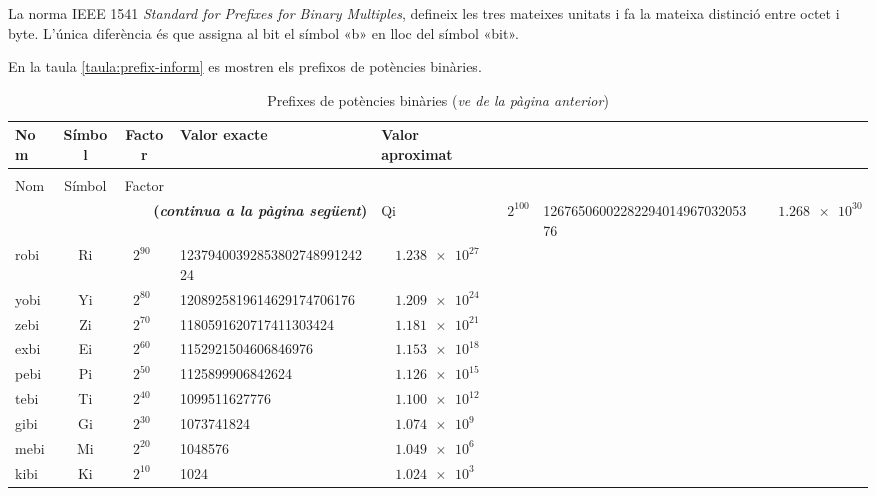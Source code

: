 La norma IEEE 1541 \textit{Standard for Prefixes for Binary Multiples}, defineix les tres mateixes unitats i fa la mateixa distinció entre octet i byte. L'única diferència és que assigna al bit el símbol «b» en lloc del símbol «bit».

En la taula \vref{taula:prefix-inform} es mostren els prefixos de potències binàries.
\begin{longtable}[h]{lccll}
   \caption{\label{taula:prefix-inform} Prefixos de potències binàries}\\
   \toprule[1pt]
    Nom & Símbol  & Factor & Valor exacte & Valor aproximat\\
   \midrule
   \endfirsthead
   \caption[]{Prefixes de potències binàries (\emph{ve de la pàgina anterior})}\\
   \toprule[1pt]
    Nom & Símbol  & Factor \\
   \midrule
   \endhead
   \midrule
   \multicolumn{4}{r}{\sffamily\bfseries\color{NavyBlue}(\emph{continua a la pàgina següent})}
   \endfoot
   \endlastfoot
   quebi & Qi   & $2^{100}$ & \num{1267650600228229401496703205376} &  $\quad\num{1,268e30}$ \\
   robi & Ri   & $2^{90\phantom{0}}$ & \num{1237940039285380274899124224} &  $\quad\num{1,238e27}$ \\
   yobi & Yi   & $2^{80\phantom{0}}$ & \num{1208925819614629174706176} &  $\quad\num{1,209e24}$ \\
   zebi & Zi   & $2^{70\phantom{0}}$ & \num{1180591620717411303424}&  $\quad\num{1,181e21}$ \\
   exbi & Ei   & $2^{60\phantom{0}}$ & \num{1152921504606846976}&  $\quad\num{1,153e18}$ \\
   pebi & Pi   & $2^{50\phantom{0}}$ & \num{1125899906842624}&  $\quad\num{1,126e15}$ \\
   tebi & Ti   & $2^{40\phantom{0}}$ & \num{1099511627776}&  $\quad\num{1,100e12}$ \\
   gibi & Gi   & $2^{30\phantom{0}}$ & \num{1073741824}&  $\quad\num{1,074e9}$  \\
   mebi & Mi   & $2^{20\phantom{0}}$ & \num{1048576} &  $\quad\num{1,049e6}$ \\
   kibi & Ki   & $2^{10\phantom{0}}$ & \num{1024} & $\quad\num{1,024e3}$  \\
   \bottomrule[1pt]
\end{longtable}
                     

